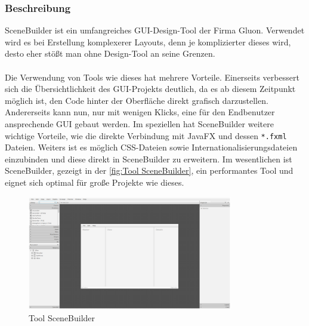 \subsubsection{Beschreibung}
SceneBuilder ist ein umfangreiches GUI-Design-Tool der Firma Gluon.
Verwendet wird es bei Erstellung komplexerer Layouts, denn je komplizierter dieses wird, desto eher stößt man ohne Design-Tool an seine Grenzen.\\\\
Die Verwendung von Tools wie dieses hat mehrere Vorteile.
Einerseits verbessert sich die Übersichtlichkeit des GUI-Projekts deutlich, da es ab diesem Zeitpunkt möglich ist, den Code hinter der Oberfläche direkt grafisch darzustellen.
Andererseits kann nun, nur mit wenigen Klicks, eine für den Endbenutzer ansprechende GUI gebaut werden.
Im speziellen hat SceneBuilder weitere wichtige Vorteile, wie die direkte Verbindung mit JavaFX und dessen \lstinline{*.fxml} Dateien.
Weiters ist es möglich \acs{CSS}-Dateien sowie Internationalisierungsdateien einzubinden und diese direkt in SceneBuilder zu erweitern.
Im wesentlichen ist SceneBuilder, gezeigt in der \autoref{fig:Tool SceneBuilder}, ein performantes Tool und eignet sich optimal für große Projekte wie dieses.
\begin{figure}[H]
    \centering
    \includegraphics[width=0.8\textwidth]{fig/ainf/SceneBuilder.png}
    \caption{Tool SceneBuilder}
    \label{fig:Tool SceneBuilder}
\end{figure}
